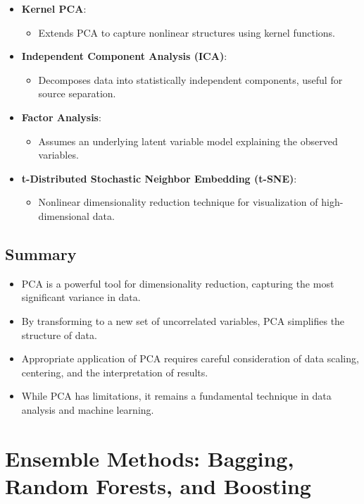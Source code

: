 \documentclass{article}
\begin{document}
\begin{itemize}
    \item \textbf{Kernel PCA}:
    \begin{itemize}
        \item Extends PCA to capture nonlinear structures using kernel functions.
    \end{itemize}
    \item \textbf{Independent Component Analysis (ICA)}:
    \begin{itemize}
        \item Decomposes data into statistically independent components, useful for source separation.
    \end{itemize}
    \item \textbf{Factor Analysis}:
    \begin{itemize}
        \item Assumes an underlying latent variable model explaining the observed variables.
    \end{itemize}
    \item \textbf{t-Distributed Stochastic Neighbor Embedding (t-SNE)}:
    \begin{itemize}
        \item Nonlinear dimensionality reduction technique for visualization of high-dimensional data.
    \end{itemize}
\end{itemize}

\subsection{Summary}

\begin{itemize}
    \item PCA is a powerful tool for dimensionality reduction, capturing the most significant variance in data.
    \item By transforming to a new set of uncorrelated variables, PCA simplifies the structure of data.
    \item Appropriate application of PCA requires careful consideration of data scaling, centering, and the interpretation of results.
    \item While PCA has limitations, it remains a fundamental technique in data analysis and machine learning.
\end{itemize}

\section{Ensemble Methods: Bagging, Random Forests, and Boosting}
\end{document}
